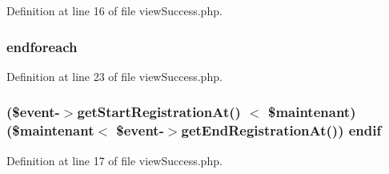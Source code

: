 Definition at line 16 of file view\-Success.\-php.

\hypertarget{live_2modules_2tournament_2templates_2view_success_8php_a672d9707ef91db026c210f98cc601123}{
\subsubsection[{endforeach}]{\setlength{\rightskip}{0pt plus 5cm}endforeach}}\label{live_2modules_2tournament_2templates_2view_success_8php_a672d9707ef91db026c210f98cc601123}


Definition at line 23 of file view\-Success.\-php.

\hypertarget{live_2modules_2tournament_2templates_2view_success_8php_a6a4e0258f03fd41cbc37d46e04b7be7f}{
\subsubsection[{endif}]{ (\$event-\/$>$get\-Start\-Registration\-At() $<$ \$maintenant) (\$maintenant$<$ \$event-\/$>$get\-End\-Registration\-At()) endif}}\label{live_2modules_2tournament_2templates_2view_success_8php_a6a4e0258f03fd41cbc37d46e04b7be7f}


Definition at line 17 of file view\-Success.\-php.

